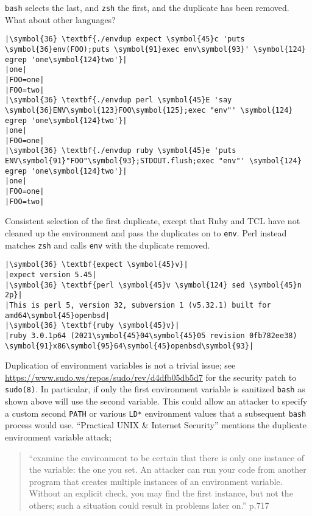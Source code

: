 \documentclass[10pt,a4paper]{article}
\begin{document}
\texttt{bash} selects the last, and \texttt{zsh} the first, and the
duplicate has been removed. What about other languages?

\begin{lstlisting}
|\symbol{36} \textbf{./envdup expect \symbol{45}c 'puts \symbol{36}env(FOO);puts \symbol{91}exec env\symbol{93}' \symbol{124} egrep 'one\symbol{124}two'}|
|one|
|FOO=one|
|FOO=two|
|\symbol{36} \textbf{./envdup perl \symbol{45}E 'say \symbol{36}ENV\symbol{123}FOO\symbol{125};exec "env"' \symbol{124} egrep 'one\symbol{124}two'}|
|one|
|FOO=one|
|\symbol{36} \textbf{./envdup ruby \symbol{45}e 'puts ENV\symbol{91}"FOO"\symbol{93};STDOUT.flush;exec "env"' \symbol{124} egrep 'one\symbol{124}two'}|
|one|
|FOO=one|
|FOO=two|
\end{lstlisting}

Consistent selection of the first duplicate, except that Ruby and TCL
have not cleaned up the environment and pass the duplicates on to
\texttt{env}. Perl instead matches \texttt{zsh} and calls \texttt{env}
with the duplicate removed.

\begin{lstlisting}
|\symbol{36} \textbf{expect \symbol{45}v}|
|expect version 5.45|
|\symbol{36} \textbf{perl \symbol{45}v \symbol{124} sed \symbol{45}n 2p}|
|This is perl 5, version 32, subversion 1 (v5.32.1) built for amd64\symbol{45}openbsd|
|\symbol{36} \textbf{ruby \symbol{45}v}|
|ruby 3.0.1p64 (2021\symbol{45}04\symbol{45}05 revision 0fb782ee38) \symbol{91}x86\symbol{95}64\symbol{45}openbsd\symbol{93}|
\end{lstlisting}

Duplication of environment variables is not a trivial issue; see
\url{https://www.sudo.ws/repos/sudo/rev/d4dfb05db5d7} for the security
patch to \texttt{sudo(8)}. In particular, if only the first environment
variable is sanitized \texttt{bash} as shown above will use the second
variable. This could allow an attacker to specify a custom second
\texttt{PATH} or various \texttt{LD*} environment values that
a subsequent \texttt{bash} process would use. ``Practical UNIX \&
Internet Security''\cite{simson1996} mentions the duplicate environment
variable attack;

\begin{quote}
``examine the environment to be certain that there is only one instance
of the variable: the one you set. An attacker can run your code from
another program that creates multiple instances of an environment
variable. Without an explicit check, you may find the first instance,
but not the others; such a situation could result in problems later
on.'' p.717
\end{quote}
\end{document}
